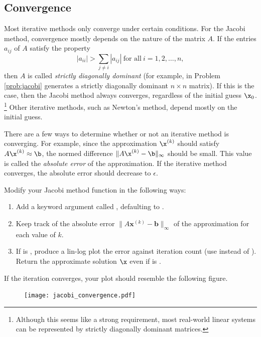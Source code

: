 \subsection*{Convergence} %

Most iterative methods only converge under certain conditions.
For the Jacobi method, convergence mostly depends on the nature of the matrix $A$.
If the entries $a_{ij}$ of $A$ satisfy the property \[|a_{ii}| > \sum_{j \neq i} |a_{ij}|\ \text{for all}\ i = 1,2,\hdots,n,\] then $A$ is called \emph{strictly diagonally dominant} (for example,  in Problem \ref{prob:jacobi} generates a strictly diagonally dominant $n\times n$ matrix).
If this is the case, then the Jacobi method always converges, regardless of the initial guess $\x_0$.%
\footnote{Although this seems like a strong requirement, most real-world linear systems can be represented by strictly diagonally dominant matrices.
}
Other iterative methods, such as Newton's method, depend mostly on the initial guess.

There are a few ways to determine whether or not an iterative method is converging.
For example, since the approximation $\x^{(k)}$ should satisfy $A\x^{(k)} \approx \b$, the normed difference $\|A\x^{(k)} - \b\|_\infty$ should be small.
This value is called the \emph{absolute error} of the approximation.
If the iterative method converges, the absolute error should decrease to $\epsilon$.

\begin{problem}
Modify your Jacobi method function in the following ways:
\begin{enumerate}
    \item Add a keyword argument called , defaulting to .
    \item Keep track of the absolute error $\|A\mathbf{x}^{(k)} - \mathbf{b}\|_{\infty}$ of the approximation for each value of $k$.
    \item If  is , produce a lin-log plot the error against iteration count (use  instead of ).
    Return the approximate solution $\x$ even if  is .
\end{enumerate}
If the iteration converges, your plot should resemble the following figure.

\begin{figure}[H]
    \texttt{[image: jacobi\_convergence.pdf]}
\end{figure}

\label{prob:plot-iterative-convergence}
\end{problem}

